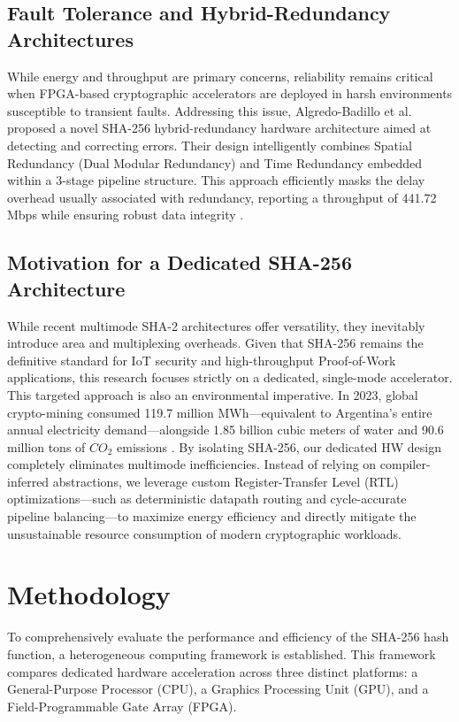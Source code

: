 \documentclass[conference]{IEEEtran}
\begin{document}
\subsection{Fault Tolerance and Hybrid-Redundancy Architectures}
While energy and throughput are primary concerns, reliability remains critical when FPGA-based cryptographic accelerators are deployed in harsh environments susceptible to transient faults. Addressing this issue, Algredo-Badillo et al. \cite{algredo2022} proposed a novel SHA-256 hybrid-redundancy hardware architecture aimed at detecting and correcting errors. Their design intelligently combines Spatial Redundancy (Dual Modular Redundancy) and Time Redundancy embedded within a 3-stage pipeline structure. This approach efficiently masks the delay overhead usually associated with redundancy, reporting a throughput of 441.72 Mbps while ensuring robust data integrity \cite{algredo2022}.

\subsection{Motivation for a Dedicated SHA-256 Architecture}
While recent multimode SHA-2 architectures offer versatility, they inevitably introduce area and multiplexing overheads. Given that SHA-256 remains the definitive standard for IoT security and high-throughput Proof-of-Work applications, this research focuses strictly on a dedicated, single-mode accelerator. This targeted approach is also an environmental imperative. In 2023, global crypto-mining consumed 119.7 million MWh—equivalent to Argentina's entire annual electricity demand—alongside 1.85 billion cubic meters of water and 90.6 million tons of $CO_{2}$ emissions \cite{laimon2025}. By isolating SHA-256, our dedicated HW design completely eliminates multimode inefficiencies. Instead of relying on compiler-inferred abstractions, we leverage custom Register-Transfer Level (RTL) optimizations—such as deterministic datapath routing and cycle-accurate pipeline balancing—to maximize energy efficiency and directly mitigate the unsustainable resource consumption of modern cryptographic workloads.

\section{Methodology}
To comprehensively evaluate the performance and efficiency of the SHA-256 hash function, a heterogeneous computing framework is established. This framework compares dedicated hardware acceleration across three distinct platforms: a General-Purpose Processor (CPU), a Graphics Processing Unit (GPU), and a Field-Programmable Gate Array (FPGA).
\end{document}

